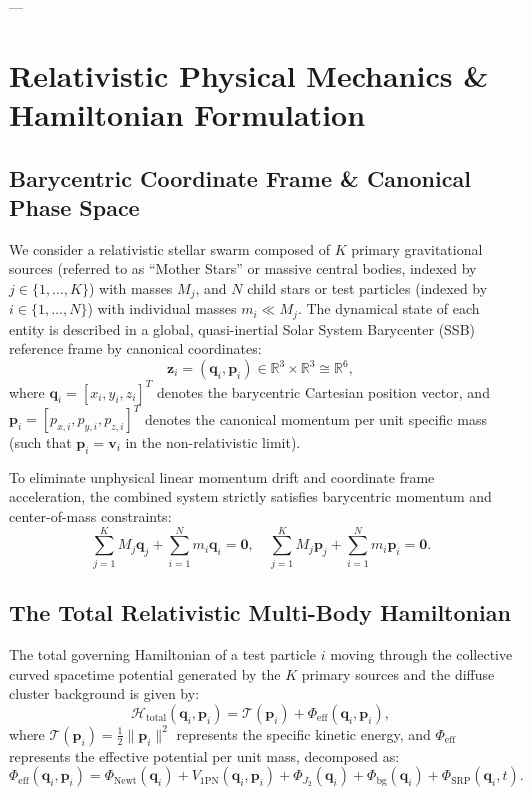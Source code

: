 \documentclass[preprint,12pt,3p]{elsarticle}
\begin{document}
---

\section{Relativistic Physical Mechanics \& Hamiltonian Formulation}\label{sec:physics}

\subsection{Barycentric Coordinate Frame \& Canonical Phase Space}
We consider a relativistic stellar swarm composed of $K$ primary gravitational sources (referred to as ``Mother Stars'' or massive central bodies, indexed by $j \in \{1, \dots, K\}$) with masses $M_j$, and $N$ child stars or test particles (indexed by $i \in \{1, \dots, N\}$) with individual masses $m_i \ll M_j$. The dynamical state of each entity is described in a global, quasi-inertial Solar System Barycenter (SSB) reference frame by canonical coordinates:
\begin{equation}
\bm{z}_i = (\bm{q}_i, \bm{p}_i) \in \mathbb{R}^3 \times \mathbb{R}^3 \cong \mathbb{R}^6,
\end{equation}
where $\bm{q}_i = [x_i, y_i, z_i]^T$ denotes the barycentric Cartesian position vector, and $\bm{p}_i = [p_{x,i}, p_{y,i}, p_{z,i}]^T$ denotes the canonical momentum per unit specific mass (such that $\bm{p}_i = \bm{v}_i$ in the non-relativistic limit).

To eliminate unphysical linear momentum drift and coordinate frame acceleration, the combined system strictly satisfies barycentric momentum and center-of-mass constraints:
\begin{equation}
\sum_{j=1}^{K} M_j \bm{q}_j + \sum_{i=1}^{N} m_i \bm{q}_i = \bm{0}, \quad \sum_{j=1}^{K} M_j \bm{p}_j + \sum_{i=1}^{N} m_i \bm{p}_i = \bm{0}.
\label{eq:barycenter_balance}
\end{equation}

\subsection{The Total Relativistic Multi-Body Hamiltonian}
The total governing Hamiltonian of a test particle $i$ moving through the collective curved spacetime potential generated by the $K$ primary sources and the diffuse cluster background is given by:
\begin{equation}
\mathcal{H}_{\mathrm{total}}(\bm{q}_i, \bm{p}_i) = \mathcal{T}(\bm{p}_i) + \Phi_{\mathrm{eff}}(\bm{q}_i, \bm{p}_i),
\label{eq:total_hamiltonian}
\end{equation}
where $\mathcal{T}(\bm{p}_i) = \frac{1}{2}\|\bm{p}_i\|^2$ represents the specific kinetic energy, and $\Phi_{\mathrm{eff}}$ represents the effective potential per unit mass, decomposed as:
\begin{equation}
\Phi_{\mathrm{eff}}(\bm{q}_i, \bm{p}_i) = \Phi_{\mathrm{Newt}}(\bm{q}_i) + V_{1\mathrm{PN}}(\bm{q}_i, \bm{p}_i) + \Phi_{J_2}(\bm{q}_i) + \Phi_{\mathrm{bg}}(\bm{q}_i) + \Phi_{\mathrm{SRP}}(\bm{q}_i, t).
\label{eq:phi_eff_decomposition}
\end{equation}
\end{document}
